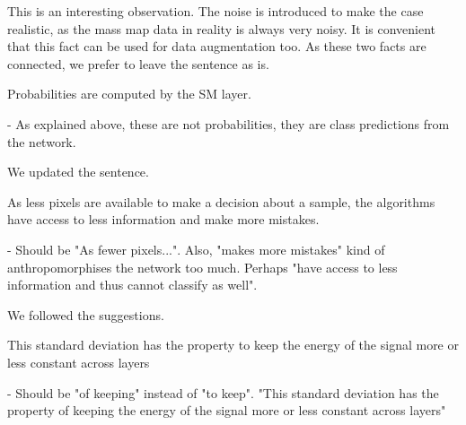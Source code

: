 \documentclass[12pt,a4paper]{article}
\newcommand{\nati}[1]{{\color[rgb]{.1,.6,.1}{NP: #1}}}
\newcommand{\mdeff}[1]{{\color[rgb]{.1,.6,.1}{MD: #1}}}
\newcommand{\TK}[1]{{\color{red}{TK: #1}}}
\newcommand{\1}{\b{1}}              %
\newcommand{\0}{\b{0}}              %
\begin{document}


This is an interesting observation. The noise is introduced to make the case realistic, as the mass map data in reality is always very noisy.
It is convenient that this fact can be used for data augmentation too. %
As these two facts are connected, we prefer to leave the sentence as is.

\begin{mdframed}[style=comment]
Probabilities are computed by the SM layer.

- As explained above, these are not probabilities, they are class predictions from the network.
\end{mdframed}


We updated the sentence.

\begin{mdframed}[style=comment]
As less pixels are available to make a decision about a sample, the algorithms have access to less information and make more mistakes.

- Should be "As fewer pixels...". Also, "makes more mistakes" kind of anthropomorphises the network too much. Perhaps "have access to less information and thus cannot classify as well".
\end{mdframed}

We followed the suggestions.

\begin{mdframed}[style=comment]
This standard deviation has the property to keep the energy of the signal more or less constant across layers

- Should be "of keeping" instead of "to keep". "This standard deviation has the property of keeping the energy of the signal more or less constant across layers"
\end{mdframed}
\end{document}
